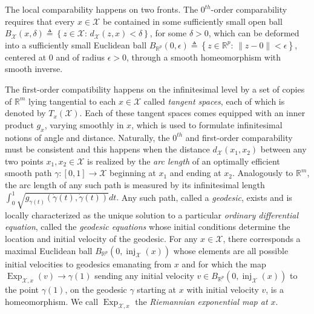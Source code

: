 \documentclass[anon,12pt]{colt2021} %
\newcommand{\rr}{{\mathbb{R}}}
\newcommand{\rrflex}[1]{{\ensuremath{\rr^{#1}
}}}
\newcommand{\rrm}{{\rrflex{m}}}
\newcommand{\rrp}{{\rrflex{p}}}
\newcommand{\xxx}{\mathcal{X}}
\begin{document}
The local comparability happens on two fronts.  The $0^{th}$-order comparability requires that every $x \in \xxx$ be contained in some sufficiently small open ball $B_{\xxx}(x,\delta)\triangleq \left\{
z \in \xxx:\, d_{\xxx}(z,x)<\delta
\right\}$, for some $\delta>0$, which can be deformed into a sufficiently small Euclidean ball $B_{\rrp}(0,\epsilon)\triangleq \left\{
z \in \rrp:\, \|z-0\|<\epsilon
\right\}$, centered at $0$ and of radius $\epsilon>0$, through a smooth homeomorphism with smooth inverse.  

The first-order compatibility happens on the infinitesimal level by a set of copies of $\rrm$ lying tangential to each $x \in \xxx$ called \textit{tangent spaces}, each of which is denoted by $T_x(\xxx)$.  Each of these tangent spaces comes equipped with an inner product $g_x$, varying smoothly in $x$, which is used to formulate infinitesimal notions of angle and distance.  Naturally, the $0^{th}$ and first-order comparability must be consistent and this happens when the distance $d_{\xxx}(x_1,x_2)$ between any two points $x_1,x_2 \in \xxx$ is realized by the \textit{arc length} of an optimally efficient smooth path $\gamma:[0,1]\rightarrow \xxx$ beginning at $x_1$ and ending at $x_2$.  Analogously to $\rrm$, the arc length of any such path is measured by its infinitesimal length 
$
\int_0^1 
\sqrt{
g_{\gamma(t)}\left(
    \dot{\gamma}(t)
,
    \dot{\gamma}(t)
\right)
}
dt.
$
Any such path, called a \textit{geodesic}, exists and is locally characterized as the unique solution to a particular \textit{ordinary differential equation}, called the \textit{geodesic equations} whose initial conditions determine the location and initial velocity of the geodesic.  For any $x \in \xxx$, there corresponds a maximal Euclidean ball $B_{\rrp}(0,\operatorname{inj}_{\xxx}(x))$ whose elements are all possible initial velocities to geodesics emanating from $x$ and for which the map $\operatorname{Exp}_{\xxx,x}(v)\to \gamma(1)$ sending any initial velocity $v \in B_{\rrp}(0,\operatorname{inj}_{\xxx}(x))$ to the point $\gamma(1)$, on the geodesic $\gamma$ starting at $x$ with initial velocity $v$, is a homeomorphism.  We call $\operatorname{Exp}_{\xxx,x}$ the \textit{Riemannian exponential map at $x$}.   
\end{document}

